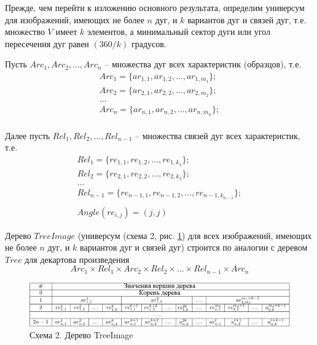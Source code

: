 Прежде, чем перейти к изложению основного результата, определим универсум для изображений, имеющих не более $n$ дуг, и $k$ вариантов дуг и связей дуг, т.е. множество $V$ имеет $k$ элементов, а минимальный сектор дуги или угол пересечения дуг равен $(360/k)$ градусов.

Пусть $Arc_1, Arc_2, ..., Arc_n$ – множества дуг всех характеристик (образцов), т.е.
\begin{equation}
\begin{array}{c}
Arc_1 = \{ar_{1,1}, ar_{1,2}, ..., ar_{1,m_1}\}; \\
Arc_2 = \{ ar_{2,1}, ar_{2,2}, ..., ar_{2,m_2}\}; \\
\dots \\
Arc_n = \{ ar_{n,1}, ar_{n,2}, ..., ar_{n,m_n}\}; \\
\end{array}
\end{equation}

Далее пусть $Rel_1, Rel_2, ..., Rel_{n-1}$ – множества связей дуг всех характеристик, т.е. 
\begin{equation}
\begin{array}{c}
Rel_1 = \{re_{1,1}, re_{1,2}, ..., re_{1,k_1}\}; \\
Rel_2 = \{ re_{2,1}, re_{2,2}, ..., re_{2,k_2}\}; \\
\dots \\
Rel_{n-1} = \{ re_{{n-1},1}, re_{{n-1},2}, ..., re_{{n-1},k_{n-1}}\}; \\
\\
Angle(re_{i,j})=(j,j)
\end{array}
\end{equation}

Дерево $TreeImage$ (универсум (схема 2, рис. \ref{tree_image}) для всех изображений, имеющих не более $n$ дуг, и $k$ вариантов дуг и связей дуг) строится по аналогии с деревом $Tree$ для декартова произведения
$$Arc_1 \times Rel_1 \times Arc_2 \times Rel_2 \times ... \times Rel_{n-1} \times Arc_n $$

\begin{figure}[b]
\includegraphics[width=\linewidth,keepaspectratio]{images/an_tbl2}
\caption{Схема 2. Дерево TreeImage}
\label{tree_image}
\end{figure}

